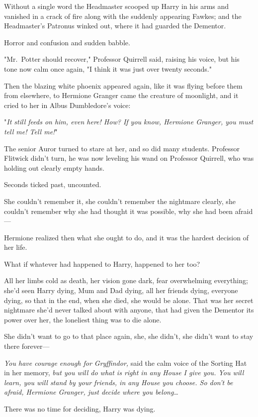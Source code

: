 Without a single word the Headmaster scooped up Harry in his arms and vanished
in a crack of fire along with the suddenly appearing Fawkes; and the
Headmaster's Patronus winked out, where it had guarded the Dementor.

Horror and confusion and sudden babble.

"Mr.~Potter should recover," Professor Quirrell said, raising his voice, but
his tone now calm once again, "I think it was just over twenty seconds."

Then the blazing white phoenix appeared again, like it was flying before them
from elsewhere, to Hermione Granger came the creature of moonlight, and it
cried to her in Albus Dumbledore's voice:

"\emph{It still feeds on him, even here! How? If you know, Hermione Granger,
you must tell me! Tell me!}"

The senior Auror turned to stare at her, and so did many students. Professor
Flitwick didn't turn, he was now leveling his wand on Professor Quirrell, who
was holding out clearly empty hands.

Seconds ticked past, uncounted.

She couldn't remember it, she couldn't remember the nightmare clearly, she
couldn't remember why she had thought it was possible, why she had been
afraid---

Hermione realized then what she ought to do, and it was the hardest decision of
her life.

What if whatever had happened to Harry, happened to her too?

All her limbs cold as death, her vision gone dark, fear overwhelming
everything; she'd seen Harry dying, Mum and Dad dying, all her friends dying,
everyone dying, so that in the end, when she died, she would be alone. That was
her secret nightmare she'd never talked about with anyone, that had given the
Dementor its power over her, the loneliest thing was to die alone.

She didn't want to go to that place again, she, she didn't, she didn't want to
stay there forever---

\emph{You have courage enough for Gryffindor,} said the calm voice of the
Sorting Hat in her memory, \emph{but you will do what is right in any House I
give you. You will learn, you will stand by your friends, in any House you
choose. So don't be afraid, Hermione Granger, just decide where you
belong{\ldots}}

There was no time for deciding, Harry was dying.

